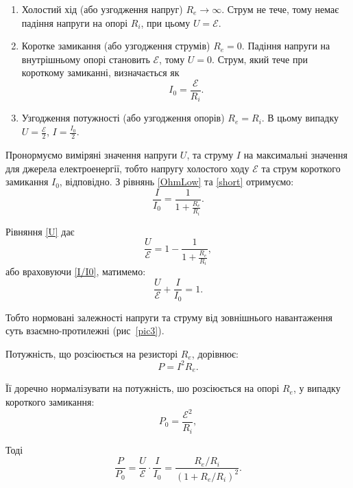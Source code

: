 \documentclass{LabWork}
\begin{document}
\begin{enumerate}
	\item Холостий хід (або узгодження напруг) $R_e \to \infty$. Струм не тече, тому  немає падіння напруги на опорі $R_i$, при цьому $U = \mathcal{E}$.
	\item Коротке замикання (або узгодження струмів) $R_e=0$. Падіння напруги на внутрішньому опорі становить $\mathcal{E}$, тому $U = 0$. Струм, який тече при короткому замиканні, визначається як
	      \begin{equation}\label{short}
		      I_0=\frac{\mathcal{E}}{R_i}.
	      \end{equation}
	\item Узгодження потужності (або узгодження опорів)  $R_e=R_i$. В цьому випадку $U = \frac{\mathcal{E}}{2}$, $I=\frac{I_0}{2}$.
\end{enumerate}

Пронормуємо виміряні значення напруги $U$, та струму $I$ на максимальні значення для джерела електроенергії, тобто напругу холостого ходу $\mathcal{E}$ та струм короткого замикання $I_0$, відповідно. З рівнянь \eqref{OhmLow} та \eqref{short} отримуємо:
\begin{equation}\label{I/I0}
	\frac{I}{I_0} = \frac{1}{1 + \frac{R_e}{R_i}}.
\end{equation}

Рівняння \eqref{U} дає
\begin{equation}\label{Г/Г0}
	\frac{U}{\mathcal{E}} = 1 - \frac{1}{1 + \frac{R_e}{R_i}},
\end{equation}
або враховуючи \eqref{I/I0}, матимемо:
\begin{equation}
	\frac{U}{\mathcal{E}} + \frac{I}{I_0}  = 1.
\end{equation}

Тобто нормовані залежності напруги та струму від зовнішнього навантаження суть взаємно-протилежні (рис~\ref{pic3}).

Потужність, що розсіюється на резисторі $R_e$, дорівнює:
\begin{equation}\label{P}
	P = I^2R_e.
\end{equation}

Її доречно нормалізувати на потужність, шо розсіюється на опорі $R_e$, у випадку короткого замикання:
\begin{equation}\label{Pkz}
	P_0 = \frac{\mathcal{E}^2}{R_i},
\end{equation}

Тоді
\begin{equation}\label{P/P0}
	\frac{P}{P_0} = \frac{U}{\mathcal{E}} \cdot \frac{I}{I_0} = \frac{R_e/R_i}{\left( 1+ R_e/R_i \right)^2 }.
\end{equation}
\end{document}
